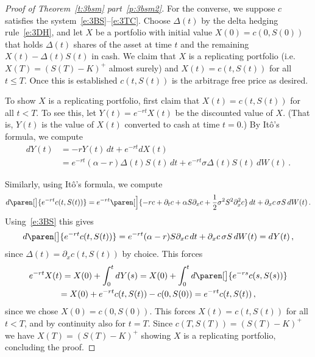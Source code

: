 \begin{proof}[Proof of Theorem~\ref{t:3bsm} part~\ref{p:3bsm2}]
  For the converse, we suppose $c$ satisfies the system~\eqref{e:3BS}--\eqref{e:3TC}.
  Choose $\Delta(t)$ by the delta hedging rule~\eqref{e:3DH}, and let $X$ be a portfolio with initial value $X(0) = c(0, S(0))$ that holds $\Delta(t)$ shares of the asset at time $t$ and the remaining $X(t) - \Delta(t) S(t)$ in cash.
  We claim that $X$ is a replicating portfolio (i.e.\ $X(T) = (S(T) - K)^+$ almost surely) and $X(t) = c(t, S(t))$ for all $t \leq T$.
  Once this is established $c(t, S(t))$ is the arbitrage free price as desired.

  To show $X$ is a replicating portfolio, first claim that $X(t) = c(t, S(t))$ for all $t < T$.
  To see this, let $Y(t) = e^{-r t} X(t)$ be the discounted value of $X$.
  (That is, $Y(t)$ is the value of $X(t)$ converted to cash at time $t = 0$.)
  By It\^o's formula, we compute
  \begin{align*}
    dY(t) &= -r Y(t) \, dt + e^{-rt} dX(t)
    \\
      &= e^{-rt} (\alpha - r) \Delta(t) S(t) \, dt
	  + e^{-rt} \sigma \Delta(t) S(t) \, dW(t)\,.
  \end{align*}

  Similarly, using It\^o's formula, we compute
  \begin{equation*}
    d \paren[\big]{ e^{-rt} c(t, S(t)) }
      = e^{-rt} \paren[\Big]{-r c + \partial_t c + \alpha S \partial_x c + \frac{1}{2} \sigma^2 S^2 \partial_x^2 c} \, dt
	+ \partial_x c\, \sigma S \, dW(t)\,.
  \end{equation*}
  Using~\eqref{e:3BS} this gives
  \begin{equation*}
    d \paren[\big]{ e^{-rt} c(t, S(t)) }
      = e^{-rt} (\alpha - r) S \partial_x c \, dt
	+ \partial_x c\, \sigma S \, dW(t)
      = dY(t)\,,
  \end{equation*}
  since $\Delta(t) = \partial_x c(t, S(t))$ by choice.
  This forces
  \begin{multline*}
    e^{-rt} X(t)
      = X(0) + \int_0^t dY(s)
      = X(0) + \int_0^t d\paren[\big]{ e^{-rs} c(s, S(s)) }
    \\
      = X(0) + e^{-rt}c(t, S(t)) - c(0, S(0))
      = e^{-rt}c(t, S(t))\,,
  \end{multline*}
  since we chose $X(0) = c(0, S(0))$.
  This forces $X(t) = c(t, S(t))$ for all $t < T$, and by continuity also for $t = T$.
  Since $c(T, S(T)) = (S(T) - K)^+$ we have $X(T) = (S(T) - K)^+$ showing $X$ is a replicating portfolio, concluding the proof.
\end{proof}
